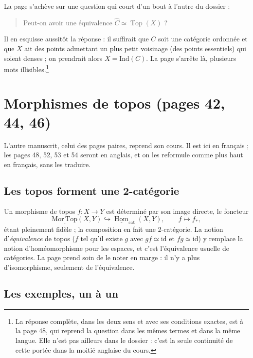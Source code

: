 \documentclass[11pt,a4paper]{article}
\begin{document}
La page s'achève sur une question qui court d'un bout à l'autre
du dossier :

\begin{quote}
Peut-on avoir une équivalence $\widehat{C} \simeq \operatorname{Top}(X)$ ?
\end{quote}

Il en esquisse aussitôt la réponse : il suffirait que $C$ soit une catégorie
ordonnée et que $X$ ait des points admettant un plus petit voisinage (des
points essentiels) qui soient denses ; on prendrait alors $X = \mathrm{Ind}(C)$.
La page s'arrête là, plusieurs mots illisibles.\footnote{La réponse complète,
dans les deux sens et avec ses conditions exactes, est à la page 48,
qui reprend la question dans les mêmes termes et dans la même langue. Elle
n'est pas ailleurs dans le dossier : c'est la seule continuité de cette
portée dans la moitié anglaise du cours.}

\section*{Morphismes de topos (pages 42, 44, 46)}

L'autre manuscrit, celui des pages paires, reprend son cours. Il est ici en
français ; les pages 48, 52, 53 et 54 seront en anglais, et on les reformule
comme plus haut en français, sans les traduire.

\subsection*{Les topos forment une 2-catégorie}

Un morphisme de topos $f : X \to Y$ est déterminé par son image directe, le
foncteur
\[
\underline{\mathrm{Mor\,Top}}(X,Y) \hookrightarrow
\underline{\operatorname{Hom}}_{\mathrm{cat}}(X,Y), \qquad f \mapsto f_{*},
\]
étant pleinement fidèle ; la composition en fait une 2-catégorie. La notion
d'\emph{équivalence} de topos ($f$ tel qu'il existe $g$ avec $gf \simeq
\mathrm{id}$ et $fg \simeq \mathrm{id}$) y remplace la notion
d'homéomorphisme pour les espaces, et c'est l'équivalence usuelle de
catégories. La page prend soin de le noter en marge : il n'y a plus
d'isomorphisme, seulement de l'équivalence.

\subsection*{Les exemples, un à un}
\end{document}
